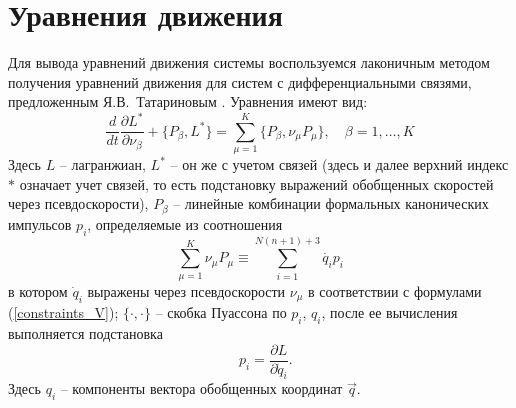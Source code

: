 \section{Уравнения движения}\label{sect:eqs}


Для вывода уравнений движения системы воспользуемся лаконичным методом получения уравнений движения для систем с дифференциальными связями, предложенным Я.В.~Татариновым \cite{Tatarinov,Zobova2011}. Уравнения имеют вид:
\begin{equation}\label{Tatarinov}
    \frac{d}{dt}\frac{\partial L^{*}}{\partial \nu_\beta}  + \{P_\beta, L^{*}\} = \sum\limits_{\mu = 1}^{K}\{P_\beta, \nu_\mu P_\mu\},\quad \beta = 1,\dots, K
\end{equation}
Здесь $L$ -- лагранжиан, $L^*$ -- он же с учетом связей (здесь и далее верхний индекс $*$ означает учет связей, то есть подстановку выражений обобщенных скоростей через псевдоскорости), $P_\beta$ -- линейные комбинации формальных канонических импульсов $p_i$, определяемые из соотношения
\begin{equation}\label{eq:tatimp}
    \sum\limits_{\mu=1}^{K}\nu_\mu P_\mu \equiv \sum\limits_{i=1}^{N(n+1)+3}\dot{q_i} p_i
\end{equation}
в котором $\dot{q}_i$ выражены через псевдоскорости $\nu_\mu$ в соответствии с формулами (\ref{constraints_V}); $\{\cdot, \cdot\}$ -- скобка Пуассона по $p_i$, $q_i$, после ее вычисления выполняется подстановка 
$$
    \hspace{10pt} p_i = \frac{\partial L}{\partial \dot{q}_i}.
$$
Здесь $q_i$ -- компоненты вектора обобщенных координат $\vec{q}$.

